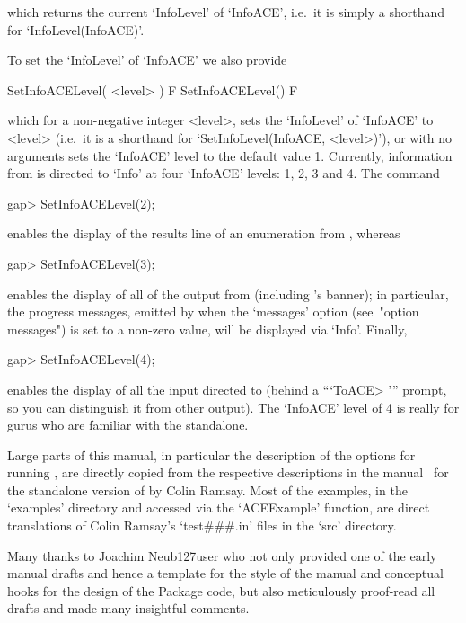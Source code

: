 which returns the current `InfoLevel' of `InfoACE', i.e.~it is  simply
a shorthand for `InfoLevel(InfoACE)'.

To set the `InfoLevel' of `InfoACE' we also provide

\>SetInfoACELevel( <level> ) F
\>SetInfoACELevel() F

which for a non-negative integer  <level>,  sets  the  `InfoLevel'  of
`InfoACE'    to    <level>    (i.e.~it    is    a    shorthand     for
`SetInfoLevel(InfoACE, <level>)'),  or  with  no  arguments  sets  the
`InfoACE' level to the default value 1.  Currently,  information  from
{\ACE} is directed to `Info' at four `InfoACE' levels: 1, 2, 3 and  4.
The command

\beginexample
gap> SetInfoACELevel(2);

\endexample

enables the display of the results line of an enumeration from {\ACE},
whereas

\beginexample
gap> SetInfoACELevel(3);

\endexample

enables the display of  all  of  the  output  from  {\ACE}  (including {\ACE}'s
banner);   in particular,  the  progress  messages,  emitted  by  {\ACE}  when
the `messages' option (see~"option messages") is set to a non-zero  value, will
be displayed via `Info'. Finally,

\beginexample
gap> SetInfoACELevel(4);

\endexample

enables the display of all the input  directed  to  {\ACE}  (behind  a
```ToACE> ''' prompt, so you can distinguish it  from  other  output).
The `InfoACE' level of 4 is really for gurus who are familiar with the
{\ACE} standalone.


Large parts of this manual,  in  particular  the  description  of  the
options for running {\ACE}, are directly copied  from  the  respective
descriptions in the manual~\cite{Ram99ace} for the standalone version  of
{\ACE} by Colin Ramsay.  Most  of  the  examples,  in  the  `examples'
directory and accessed  via  the  `ACEExample'  function,  are  direct
translations of Colin Ramsay's  `test\#\#\#.in'  files  in  the  `src'
directory.

Many thanks to Joachim Neub{\accent127u}ser who not only provided  one
of the early manual drafts and hence a template for the style  of  the
manual and conceptual hooks for the design of the  Package  code,  but
also meticulously proof-read  all  drafts  and  made  many  insightful
comments.

